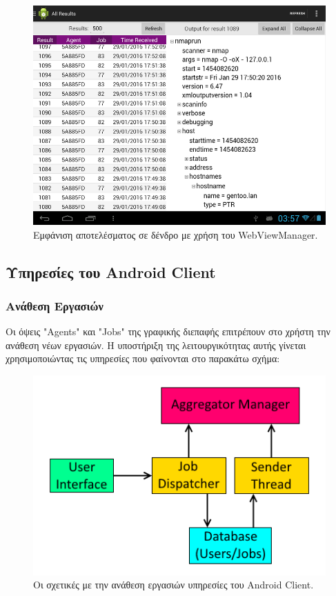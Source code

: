 \documentclass[a4paper,11pt]{article}
\begin{document}
\begin{sloppypar}
\begin{figure}[h]
\includegraphics[width=\textwidth]{results}
\centering
\caption{Eμφάνιση αποτελέσματος σε δένδρο με χρήση του WebViewManager.}
\end{figure}


\newpage

\subsection{Υπηρεσίες του Android Client}

\subsubsection{Ανάθεση Εργασιών}

Οι όψεις "Agents" και "Jobs" της γραφικής διεπαφής επιτρέπουν στο χρήστη την ανάθεση νέων εργασιών. Η υποστήριξη της λειτουργικότητας αυτής γίνεται χρησιμοποιώντας τις υπηρεσίες που φαίνονται στο παρακάτω σχήμα:

\begin{figure}[h]
\includegraphics[width=\textwidth]{services}
\centering
\caption{Οι σχετικές με την ανάθεση εργασιών υπηρεσίες του Android Client.}
\end{figure}


\end{sloppypar}
\end{document}
